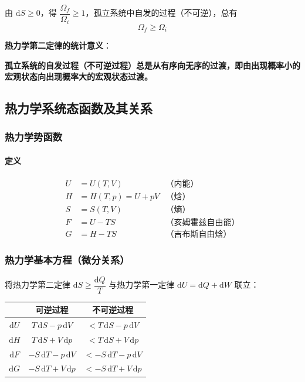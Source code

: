 \documentclass[UTF8]{ctexart}
\begin{document}
由 $\mathrm{d}S\ge 0$，得 $\dfrac{\Omega_f}{\Omega_i}\ge 1$，孤立系统中自发的过程（不可逆），总有
\[
\boxed{\Omega_f\ge\Omega_i}
\]

\textbf{热力学第二定律的统计意义}：

\textbf{孤立系统的自发过程（不可逆过程）总是从有序向无序的过渡，即由出现概率小的宏观状态向出现概率大的宏观状态过渡。}


\subsection{热力学系统态函数及其关系}

\subsubsection{热力学势函数}

\paragraph{定义}
\begin{align*}
U&=U(T,V) &\text{（内能）}\\
H&=H(T,p)=U+pV &\text{（焓）}\\
S&=S(T,V) &\text{（熵）}\\
F&=U-TS &\text{（亥姆霍兹自由能）}\\
G&=H-TS &\text{（吉布斯自由焓）}
\end{align*}

\subsubsection{热力学基本方程（微分关系）}

将热力学第二定律 $\mathrm{d}S\ge\dfrac{\mathrm{d}Q}{T}$ 与热力学第一定律 $\mathrm{d}U=\mathrm{d}Q+\mathrm{d}W$ 联立：

\begin{center}
\begin{tabular}{c|c|c}
\hline
 & 可逆过程 & 不可逆过程 \\
\hline
$\mathrm{d}U$ & $T\,\mathrm{d}S-p\,\mathrm{d}V$ & $<T\,\mathrm{d}S-p\,\mathrm{d}V$ \\
$\mathrm{d}H$ & $T\,\mathrm{d}S+V\,\mathrm{d}p$ & $<T\,\mathrm{d}S+V\,\mathrm{d}p$ \\
$\mathrm{d}F$ & $-S\,\mathrm{d}T-p\,\mathrm{d}V$ & $<-S\,\mathrm{d}T-p\,\mathrm{d}V$ \\
$\mathrm{d}G$ & $-S\,\mathrm{d}T+V\,\mathrm{d}p$ & $<-S\,\mathrm{d}T+V\,\mathrm{d}p$ \\
\hline
\end{tabular}
\end{center}
\end{document}
